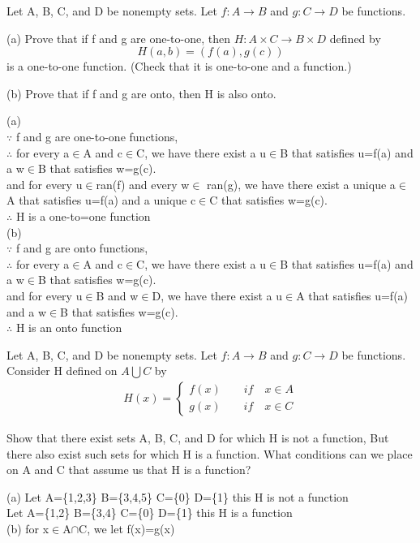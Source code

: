 \documentclass[11pt, a4paper, UTF8]{ctexart}
\begin{document}
\begin{problem}[UD:15.14]
Let A, B, C, and D be nonempty sets. Let \(f:A \rightarrow B\) and \(g:C \rightarrow D\) be functions.

(a) Prove that if f and g are one-to-one, then \(H: A \times C \rightarrow B \times D\) defined by 
\[H(a,b) = (f(a),g(c))\]
is a one-to-one function. (Check that it is one-to-one and a function.)

(b) Prove that if f and g are onto, then H is also onto.
\end{problem}
\begin{solution}
(a)\\
$\because$ f and g are one-to-one functions, \\
$\therefore$ for every a$\in$A and c$\in$C, we have there exist a u$\in$B that satisfies u=f(a) and a w$\in$B that satisfies w=g(c).\\
and for every u$\in$ran(f) and every w$\in$ ran(g), we have there exist a unique a$\in$A that satisfies u=f(a) and a unique c$\in$C that satisfies w=g(c).\\
$\therefore$ H is a one-to=one function\\
(b)\\
$\because$ f and g are onto functions, \\
$\therefore$ for every a$\in$A and c$\in$C, we have there exist a u$\in$B that satisfies u=f(a) and a w$\in$B that satisfies w=g(c).\\
and for every u$\in$B and w$\in$D, we have there exist a  u$\in$A that satisfies u=f(a) and a w$\in$B that satisfies w=g(c).\\
$\therefore$ H is an onto function\\

\end{solution}


\begin{problem}[UD:15.15]
Let A, B, C, and D be nonempty sets. Let \(f:A \rightarrow B\) and \(g:C \rightarrow D\) be functions. Consider H defined on \(A \bigcup C\) by 
\begin{align}
H(x)= 
\begin{cases}
f(x) \qquad if \quad x \in A\\
g(x) \qquad if \quad x \in C
\end{cases}
\end{align}

Show that there exist sets A, B, C, and D for which H is not a function, But there also exist such sets for which H is a function. What conditions can we place on A and C that assume us that H is a function?
\end{problem}
\begin{solution}
(a) Let A=\{1,2,3\} B=\{3,4,5\} C=\{0\} D=\{1\} this H is not a function\\
 Let A=\{1,2\} B=\{3,4\} C=\{0\} D=\{1\} this H is a function\\
(b) for x$\in$A$\cap$C, we let f(x)=g(x)
\end{solution}
\end{document}
